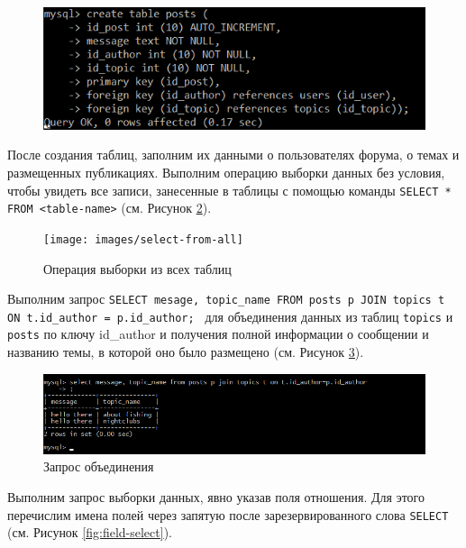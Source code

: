 \documentclass[a4paper,14pt]{extarticle}
\begin{document}
\begin{figure}[h!]
	\centering
	\includegraphics[width=0.6\linewidth]{images/create-posts}
	\caption{}
	\label{fig:create-posts}
\end{figure}

После создания таблиц, заполним их данными о пользователях форума, о темах и размещенных публикациях. Выполним операцию выборки данных без условия, чтобы увидеть все записи, занесенные в таблицы с помощью команды \texttt{SELECT * FROM <table-name>} (см. Рисунок \ref{fig:select-from-all}). 

\begin{figure}[h!]
	\centering
	\texttt{[image: images/select-from-all]}
	\caption{Операция выборки из всех таблиц }
	\label{fig:select-from-all}
\end{figure}

Выполним запрос \texttt{SELECT mesage, topic\_name FROM posts p JOIN topics t ON t.id\_author = p.id\_author; } для объединения данных из таблиц \texttt{topics} и \texttt{posts} по ключу id\_author и получения полной информации о сообщении и названию темы, в которой оно было размещено (см. Рисунок \ref{fig:join-post-author}).
	
	\begin{figure}
		\centering
		\includegraphics[width=0.8\linewidth]{images/join-post-author}
		\caption{Запрос объединения}
		\label{fig:join-post-author}
	\end{figure}

Выполним запрос выборки данных, явно указав поля отношения. Для этого перечислим имена полей через запятую после зарезервированного слова \texttt{SELECT} (см. Рисунок \ref{fig:field-select}).
\end{document}
